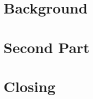 \documentclass[print,thumbmain]{src/PhdThesisMarijn}  %
\author{Name of Author}
\begin{document}
\thispagestyle{empty}







\cleardoublepage
{}
\tableofcontents

\newpage


\isstarredchapterfalse
\cleardoublepage
\thispagestyle{empty}
\setcounter{page}{1}
\part{Background}\label{part:background}



\cleardoublepage
\part{Second Part}\label{part:design}




\part{Closing}\label{part:closing}

\end{document}
